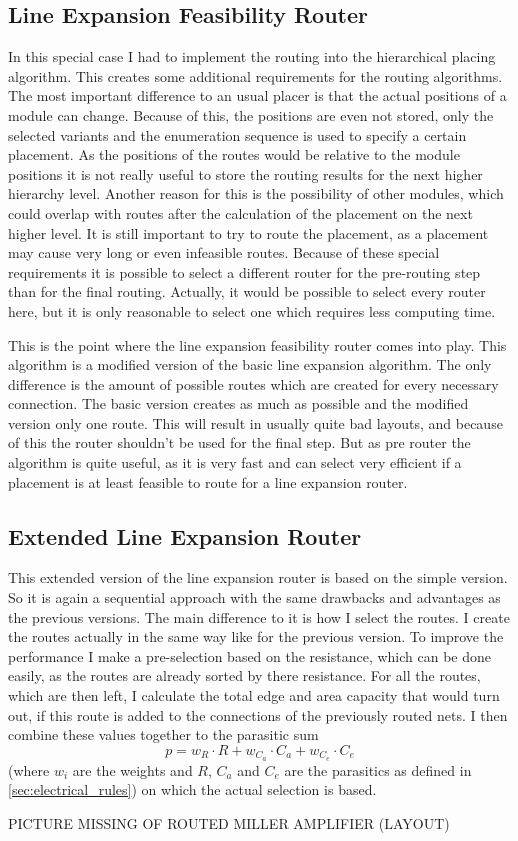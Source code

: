 \subsection{Line Expansion Feasibility Router}
In this special case I had to implement the routing into the hierarchical placing algorithm. This creates some additional requirements for the routing algorithms. The most important difference to an usual placer is that the actual positions of a module can change. Because of this, the positions are even not stored, only the selected variants and the enumeration sequence is used to specify a certain placement. As the positions of the routes would be relative to the module positions it is not really useful to store the routing results for the next higher hierarchy level. Another reason for this is the possibility of other modules, which could overlap with routes after the calculation of the placement on the next higher level. It is still important to try to route the placement, as a placement may cause very long or even infeasible routes. Because of these special requirements it is possible to select a different router for the pre-routing step than for the final routing. Actually, it would be possible to select every router here, but it is only reasonable to select one which requires less computing time.

This is the point where the line expansion feasibility router comes into play. This algorithm is a modified version of the basic line expansion algorithm. The only difference  is the amount of possible routes which are created for every necessary connection. The basic version creates as much as possible and the modified version only one route. This will result in usually quite bad layouts, and because of this the router shouldn't be used for the final step. But as pre router the algorithm is quite useful, as it is very fast and can select very efficient if a placement is at least feasible to route for a line expansion router.

\subsection{Extended Line Expansion Router}
This extended version of the line expansion router is based on the simple version. So it is again a sequential approach with the same drawbacks and advantages as the previous versions. The main difference to it is how I select the routes. I create the routes actually in the same way like for the previous version. To improve the performance I make a pre-selection based on the resistance, which can be done easily, as the routes are already sorted by there resistance. For all the routes, which are then left, I calculate the total edge and area capacity that would turn out, if this route is added to the connections of the previously routed nets. I then combine these values together to the parasitic sum
\[p = w_R \cdot R + w_{C_a} \cdot C_a + w_{C_e} \cdot C_e\]
(where $w_i$ are the weights and $R$, $C_a$ and $C_e$ are the parasitics as defined in \ref{sec:electrical_rules}) on which the actual selection is based.

PICTURE MISSING OF ROUTED MILLER AMPLIFIER (LAYOUT)